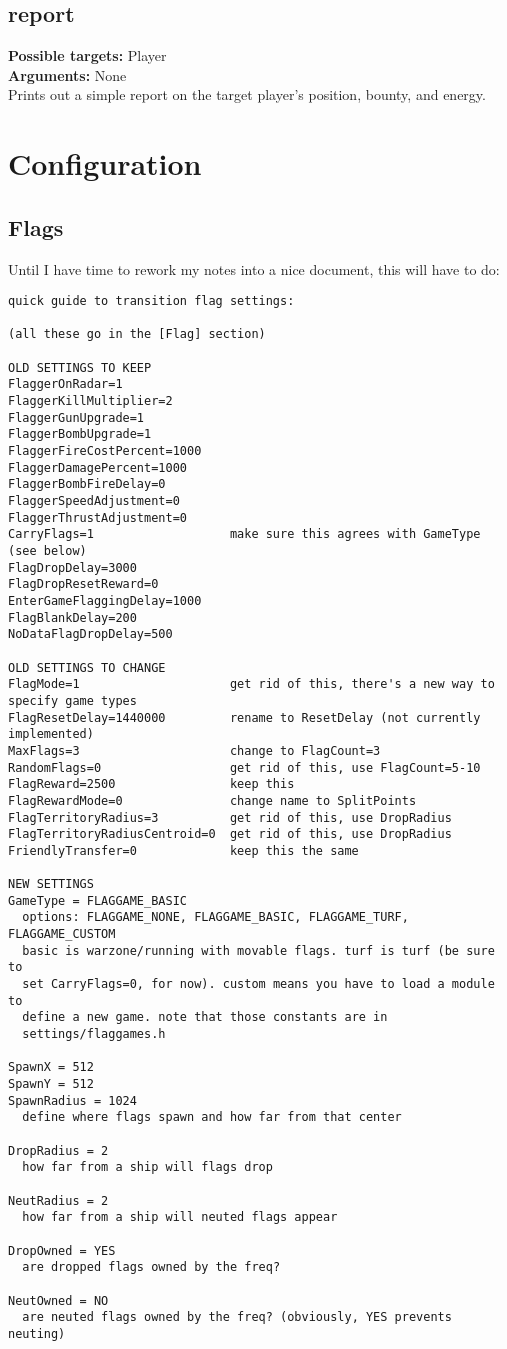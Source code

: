 \documentclass{article}
\newcommand{\targets}[1]{\noindent\textbf{Possible targets:} #1\\}
\newcommand{\args}[1]{\noindent\textbf{Arguments:} #1\\}
\begin{document}
\subsection{report}  %
\targets{Player}
\args{None}
Prints out a simple report on the target player's position, bounty, and
energy.


\section{Configuration}


\subsection{Flags}

Until I have time to rework my notes into a nice document, this will
have to do:

\begin{verbatim}
quick guide to transition flag settings:

(all these go in the [Flag] section)

OLD SETTINGS TO KEEP
FlaggerOnRadar=1
FlaggerKillMultiplier=2
FlaggerGunUpgrade=1
FlaggerBombUpgrade=1
FlaggerFireCostPercent=1000
FlaggerDamagePercent=1000
FlaggerBombFireDelay=0
FlaggerSpeedAdjustment=0
FlaggerThrustAdjustment=0
CarryFlags=1                   make sure this agrees with GameType (see below)
FlagDropDelay=3000
FlagDropResetReward=0
EnterGameFlaggingDelay=1000
FlagBlankDelay=200
NoDataFlagDropDelay=500

OLD SETTINGS TO CHANGE
FlagMode=1                     get rid of this, there's a new way to specify game types
FlagResetDelay=1440000         rename to ResetDelay (not currently implemented)
MaxFlags=3                     change to FlagCount=3
RandomFlags=0                  get rid of this, use FlagCount=5-10
FlagReward=2500                keep this
FlagRewardMode=0               change name to SplitPoints
FlagTerritoryRadius=3          get rid of this, use DropRadius
FlagTerritoryRadiusCentroid=0  get rid of this, use DropRadius
FriendlyTransfer=0             keep this the same

NEW SETTINGS
GameType = FLAGGAME_BASIC
  options: FLAGGAME_NONE, FLAGGAME_BASIC, FLAGGAME_TURF, FLAGGAME_CUSTOM
  basic is warzone/running with movable flags. turf is turf (be sure to
  set CarryFlags=0, for now). custom means you have to load a module to
  define a new game. note that those constants are in
  settings/flaggames.h

SpawnX = 512
SpawnY = 512
SpawnRadius = 1024
  define where flags spawn and how far from that center

DropRadius = 2
  how far from a ship will flags drop

NeutRadius = 2
  how far from a ship will neuted flags appear

DropOwned = YES
  are dropped flags owned by the freq?

NeutOwned = NO
  are neuted flags owned by the freq? (obviously, YES prevents neuting)
\end{verbatim}
\end{document}

